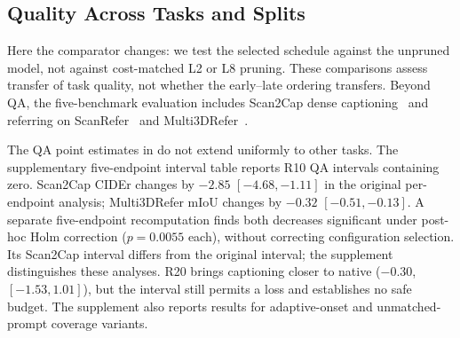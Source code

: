 \subsection{Quality Across Tasks and Splits}
Here the comparator changes: we test the selected schedule against the unpruned model, not against cost-matched L2 or L8 pruning. These comparisons assess transfer of task quality, not whether the early--late ordering transfers. Beyond QA, the five-benchmark evaluation includes Scan2Cap dense captioning~\citep{chen2021scan2cap} and referring on ScanRefer~\citep{chen2020scanrefer} and Multi3DRefer~\citep{zhang2023multi3drefer}.
\begin{table}[t]
\centering
\caption{\textbf{Five-benchmark evaluation on 3D-LLaVA.} L14/R10 unless R=20\% is specified. Full sets use official protocols and beam 1. Scan2Cap CIDEr@0.25 scores all 2068 corpus entries, including 2007 with Mask3D predictions and 61 with empty hypotheses. Deltas are computed before rounding. R10 captioning and Multi3DRefer losses are supported by the reported interval analyses; QA and R20 captioning changes remain unresolved.}
\label{tab:five}
\end{table}

The QA point estimates in  do not extend uniformly to other tasks. The supplementary five-endpoint interval table reports R10 QA intervals containing zero. Scan2Cap CIDEr changes by $-2.85$ $[-4.68,-1.11]$ in the original per-endpoint analysis; Multi3DRefer mIoU changes by $-0.32$ $[-0.51,-0.13]$. A separate five-endpoint recomputation finds both decreases significant under post-hoc Holm correction ($p=0.0055$ each), without correcting configuration selection. Its Scan2Cap interval differs from the original interval; the supplement distinguishes these analyses. R20 brings captioning closer to native ($-0.30$, $[-1.53,1.01]$), but the interval still permits a loss and establishes no safe budget. The supplement also reports results for adaptive-onset and unmatched-prompt coverage variants.

